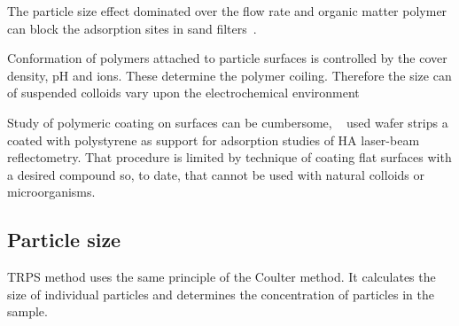 \documentclass[journal=langd5,manuscript=article]{achemso}
\begin{document}
The particle size effect dominated over the flow rate and organic matter polymer can block the adsorption sites in sand filters~\cite{Yang2015InterplayModeling}.

Conformation of polymers attached to particle surfaces is controlled by the cover density, pH and ions. These determine the polymer coiling. Therefore the size can of suspended colloids vary upon the electrochemical environment~\cite{Morales2011a}


Study of polymeric coating   on surfaces can be cumbersome,
~\citeauthor{doi:10.1021/es981236u}\cite{doi:10.1021/es981236u}
used   wafer strips  a coated with  polystyrene as support for
adsorption studies of HA laser-beam reflectometry. That procedure is
limited by technique of coating flat surfaces with a desired compound so, to date, that cannot be used with  natural colloids or microorganisms.












\subsection{Particle size}
TRPS method uses the same
principle of the Coulter method. It
calculates the size of individual particles 
and determines the  concentration of particles in the sample.
\end{document}
